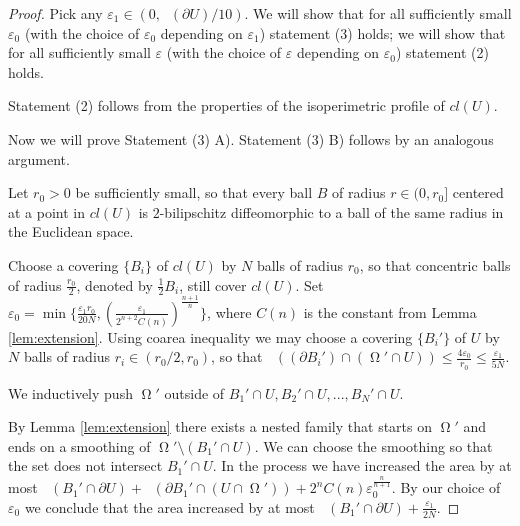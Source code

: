 \documentclass[12pt]{amsart}
\DeclareMathOperator{\Hn}{\mathcal{H}^n}
\DeclareMathOperator{\Om}{\Omega}
\DeclareMathOperator{\Si}{\Sigma}
\theoremstyle{definition}
\begin{document}
\begin{proof}
Pick any $\varepsilon_1 \in (0,\Hn(\partial U)/10)$.
We will show that for all sufficiently small $\varepsilon_0$
(with the choice of $\varepsilon_0$ depending on $\varepsilon_1$)
statement (3) holds; we will show that
for all sufficiently small 
$\varepsilon$ 
(with the choice of $\varepsilon$ depending on $\varepsilon_0$)
statement (2) holds.

Statement (2) follows from the properties of the isoperimetric profile
of $cl(U)$.

Now we will prove Statement (3) A).
Statement (3) B) follows by an analogous argument.

Let $r_0>0$ be sufficiently small, so that every 
ball $B$ of radius $r \in (0,r_0]$
centered at a point in $cl(U)$
is $2$-bilipschitz diffeomorphic
to a ball of the same radius in the Euclidean space.

Choose a covering $\{ B_i \}$ of $cl(U)$ by $N$ balls of radius $r_0$,
so that concentric balls of radius $\frac{r_0}{2}$,
denoted by $\frac{1}{2}B_i$, still cover $cl(U)$.
Set $\varepsilon_0 = \min\{ \frac{\varepsilon_1 r_0}{20 N}, 
( \frac{\varepsilon_1}{2^{n+2} C(n)})^{\frac{n+1}{n}}\}$,
where $C(n)$ is the constant from Lemma \ref*{lem:extension}.
Using coarea inequality we may choose a covering
$\{ B_i' \}$ of $U$ by $N$ balls of radius $r_i \in (r_0/2,r_0)$,
so that $\Hn((\partial B_i') \cap (\Om' \cap U)) \leq \frac{4 \varepsilon_0}{r_0}
\leq \frac{\varepsilon_1}{5 N}$.



We inductively push $\Om'$ outside of $B_1' \cap U, B_2' \cap U, ...,
B_N' \cap U$.  

By Lemma \ref*{lem:extension} there exists 
a nested family that starts on $\Om'$ and
ends on a smoothing of $\Om' \setminus (B_1' \cap U)$.
We can choose the smoothing so that the set does not intersect
$B_1' \cap U$.
In the process we have increased the area by 
at most $\Hn(B_1' \cap \partial U) + 
\Hn(\partial B_1'\cap (U \cap \Om')) + 2^n C(n) \varepsilon_0^{\frac{n}{n+1}}$.
By our choice of $\varepsilon_0$ we conclude that 
the area increased by at most $\Hn(B_1' \cap \partial U) + \frac{\varepsilon_1}{2N}$.



\end{proof}
\end{document}
